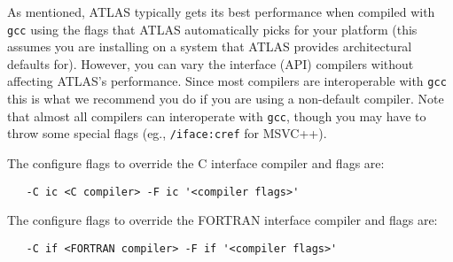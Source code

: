 \documentclass[11pt]{article}
\newcommand{\Wskip}[1]{ }
\begin{document}
As mentioned, ATLAS typically gets its best performance when compiled
with {\tt gcc} using the flags that ATLAS automatically picks for
your platform (this assumes you are installing on a system that ATLAS
provides architectural defaults for).  
However, you can vary the interface
(API) compilers without affecting ATLAS's performance.  Since most compilers
are interoperable with {\tt gcc} this is what we recommend you do if you
are using a non-default compiler.  Note that almost all compilers can
interoperate with {\tt gcc}, though you may have to throw some special
flags (eg., {\tt /iface:cref} for MSVC++).

The configure flags to override the C interface compiler and flags are:
\vspace*{-0.1in}
\begin{verbatim}
   -C ic <C compiler> -F ic '<compiler flags>'
\end{verbatim}

The configure flags to override the FORTRAN interface compiler and flags are:
\vspace*{-0.1in}
\begin{verbatim}
   -C if <FORTRAN compiler> -F if '<compiler flags>'
\end{verbatim}

\Wskip{
A few example will help here.  If I wanted to use Intel's FORTRAN and C
compilers under windows on a P4, I could issue:
\vspace*{-0.1in}
\begin{verbatim}
   -C if ifort -F if '-O2 -fltconsistency -nologo' \
   -C ic icl -F ic '-QxN -O3 -Qprec -fp:extended -fp:except -nologo -Oy'
\end{verbatim}

On the same system, if I wanted to use Intel for FORTRAN and MSVC++ for C:
\vspace*{-0.1in}
\begin{verbatim}
   -C if ifort -F if '-O2 -fltconsistency -nologo' \
   -C ic icl -F ic '-Oy -Ox -arch:SSE2 -nologo'
\end{verbatim}

For Windows, we can note a couple of things.  First, while these flags are
straight from the Windows compiler documentation, we have replaced the
Windows `{\tt /}' flag character with the Unix `{\tt -}' flag character.
This is because ATLAS doesn't call native Windows compilers directly, but
rather calls a wrapper routine that makes these compilers work with make
like a standard Unix compiler.  The second thing to notice is that we don't
have to say to use the {\tt /iface:cref} flag, because this same wrapper
always throws this flag (ATLAS does not work with the other rather bizarre
naming strategies).
}
\end{document}
